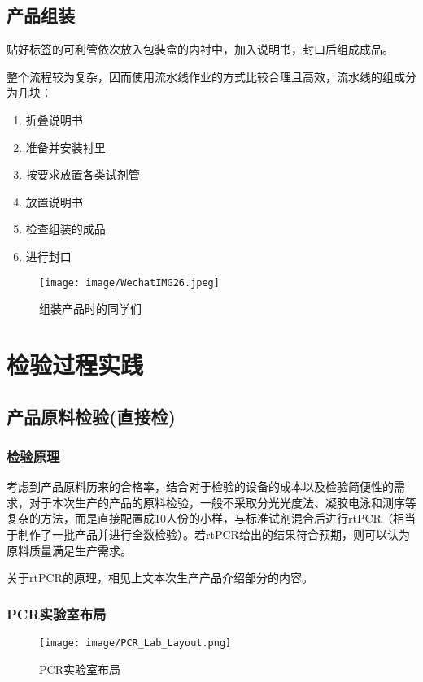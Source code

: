 \subsection{产品组装}

贴好标签的可利管依次放入包装盒的内衬中，加入说明书，封口后组成成品。

整个流程较为复杂，因而使用流水线作业的方式比较合理且高效，流水线的组成分为几块：
\begin{enumerate}
    \item 折叠说明书
    \item 准备并安装衬里
    \item 按要求放置各类试剂管
    \item 放置说明书
    \item 检查组装的成品
    \item 进行封口
\end{enumerate}

\begin{figure}[H]
    \centering
    \texttt{[image: image/WechatIMG26.jpeg]}
    \caption{组装产品时的同学们}
    \label{STAFF}
\end{figure}


\section{检验过程实践}

\subsection{产品原料检验(直接检)}

\subsubsection{检验原理}
考虑到产品原料历来的合格率，结合对于检验的设备的成本以及检验简便性的需求，对于本次生产的产品的原料检验，一般不采取分光光度法、凝胶电泳和测序等复杂的方法，而是直接配置成10人份的小样，与标准试剂混合后进行rtPCR（相当于制作了一批产品并进行全数检验）。若rtPCR给出的结果符合预期，则可以认为原料质量满足生产需求。

关于rtPCR的原理，相见上文本次生产产品介绍部分的内容。

\subsubsection{PCR实验室布局}

\begin{figure}[H]
    \centering
    \texttt{[image: image/PCR\_Lab\_Layout.png]}
    \caption{PCR实验室布局}
    \label{PCR}
\end{figure}

